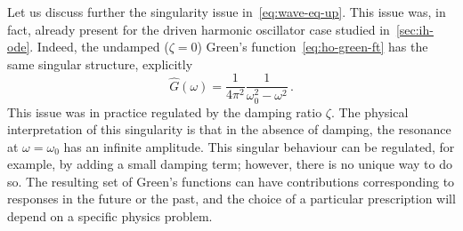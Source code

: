 Let us discuss further the singularity issue in~\cref{eq:wave-eq-up}. This issue was, in
fact, already present for the driven harmonic oscillator case studied
in~\cref{sec:ih-ode}. Indeed, the undamped (\ie $\zeta=0$) Green's
function~\cref{eq:ho-green-ft} has the same singular structure, explicitly
\begin{equation}
  \hat{G}(\omega)=\frac{1}{4\pi^2}\frac{1}{\omega_0^2-\omega^2}\,.
\end{equation}
This issue was in practice regulated by the damping ratio $\zeta$. The physical
interpretation of this singularity is that in the absence of damping, the resonance at
$\omega=\omega_0$ has an infinite amplitude. This singular behaviour can be regulated, for
example, by adding a small damping term; however, there is no unique way to do so. The
resulting set of Green's functions can have contributions corresponding to responses in
the future or the past, and the choice of a particular prescription will depend on a
specific physics problem.
